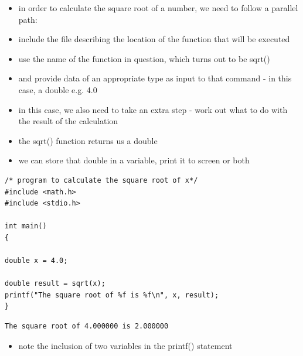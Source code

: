 \documentclass{beamer}
\begin{document}
\begin{frame}
\begin{itemize} 
\item in order to calculate the square root of a number, we need to follow a parallel path:
\item include the file describing the location of the function that will be executed
\item use the name of the function in question, which turns out to be sqrt()
\item and provide data of an appropriate type as input to that command - in this case, a double e.g. 4.0
\end{itemize}
\end{frame}

\begin{frame}
\begin{itemize} 
\item in this case, we also need to take an extra step - work out what to do with the result of the calculation
\item the sqrt() function returns us a double 
\item we can store that double in a variable, print it to screen or both
\end{itemize}
\end{frame}

\begin{frame}[fragile]
\begin{block}{}
\begin {lstlisting}
/* program to calculate the square root of x*/
#include <math.h>    
#include <stdio.h>    

int main()    
{    
   
double x = 4.0; 
 
double result = sqrt(x);    
printf("The square root of %
} 
\end{lstlisting}
\end{block}
\begin{block}{}
\begin{lstlisting}
The square root of 4.000000 is 2.000000
\end{lstlisting}
\end{block}
\begin{itemize} 
\item note the inclusion of two variables in the printf() statement
\end{itemize}
\end{frame}
\end{document}
